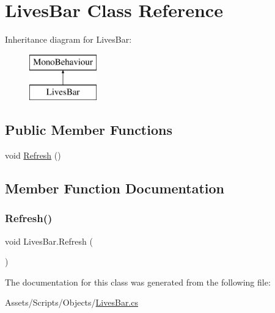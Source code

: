 \hypertarget{class_lives_bar}{}\section{Lives\+Bar Class Reference}
\label{class_lives_bar}
Inheritance diagram for Lives\+Bar\+:\begin{figure}[H]
\begin{center}
\leavevmode
\includegraphics[height=2.000000cm]{class_lives_bar}
\end{center}
\end{figure}
\subsection*{Public Member Functions}
\begin{DoxyCompactItemize}
\item 
void \mbox{\hyperlink{class_lives_bar_a5fa833098a1cba59edab020f51e69795}{Refresh}} ()
\end{DoxyCompactItemize}


\subsection{Member Function Documentation}
\mbox{\label{class_lives_bar_a5fa833098a1cba59edab020f51e69795}} 
\subsubsection{\texorpdfstring{Refresh()}{Refresh()}}
{\footnotesize\ttfamily void Lives\+Bar.\+Refresh (\begin{DoxyParamCaption}{ }\end{DoxyParamCaption})\hspace{0.3cm}{\ttfamily [inline]}}



The documentation for this class was generated from the following file\+:\begin{DoxyCompactItemize}
\item 
Assets/\+Scripts/\+Objects/\mbox{\hyperlink{_lives_bar_8cs}{Lives\+Bar.\+cs}}\end{DoxyCompactItemize}
